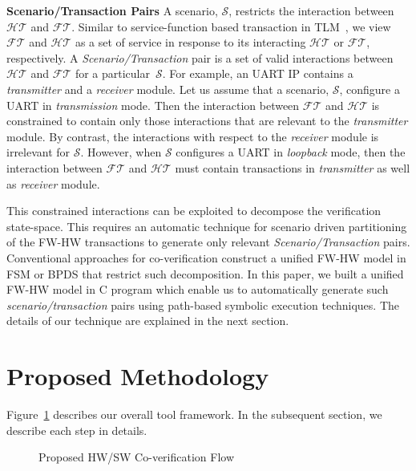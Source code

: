 \documentclass[sigconf]{acmart}
\newcommand{\Omit}[1]{}
\begin{document}
\textbf{Scenario/Transaction Pairs}
%
A scenario, $\mathcal{S}$, restricts the interaction between $\mathcal{HT}$
and $\mathcal{FT}$.  Similar to service-function based transaction in
TLM~\cite{hvc}, we view $\mathcal{FT}$ and $\mathcal{HT}$ as a set of
service in response to its interacting $\mathcal{HT}$ or $\mathcal{FT}$,
respectively.  A {\em Scenario/Transaction} pair is a set of valid
interactions between $\mathcal{HT}$ and $\mathcal{FT}$ for a
particular~$\mathcal{S}$.  For example, an UART IP contains a {\em
transmitter} and a {\em receiver} module.  Let us assume that a scenario,
$\mathcal{S}$, configure a UART in {\em transmission} mode.  Then the
interaction between $\mathcal{FT}$ and $\mathcal{HT}$ is constrained to
contain only those interactions that are relevant to the {\em transmitter}
module.  By contrast, the interactions with respect to the {\em receiver}
module is irrelevant for $\mathcal{S}$.  However, when $\mathcal{S}$
configures a UART in {\em loopback} mode, then the interaction between
$\mathcal{FT}$ and $\mathcal{HT}$ must contain transactions in {\em
transmitter} as well as {\em receiver} module.

This constrained interactions can be exploited 
to decompose the verification state-space. 
This requires an automatic technique for scenario driven 
partitioning of the FW-HW transactions to generate only 
relevant {\em Scenario/Transaction} pairs. Conventional 
approaches for co-verification construct a unified 
FW-HW model in FSM or BPDS that restrict such decomposition. 
In this paper, we built a unified FW-HW model in C program 
which enable us to automatically generate such {\em scenario/transaction} 
pairs using path-based symbolic execution techniques. The details 
of our technique are explained in the next section.
%
\Omit{
\textbf{Problem Statement}
Given a FW model in C, HW models in Verilog RTL, a property $\psi$ and 
a set of scenarios, the goal is to check whether $\psi$ holds under all 
scenarios in the combined FW-HW model. 
}
%
\section{Proposed Methodology}
Figure~\ref{proposed-flow} describes our overall tool framework. In the
subsequent section, we describe each step in details. 

\begin{figure}[t]
{}
\caption{Proposed HW/SW Co-verification Flow
\label{proposed-flow}}
\end{figure}
\end{document}
